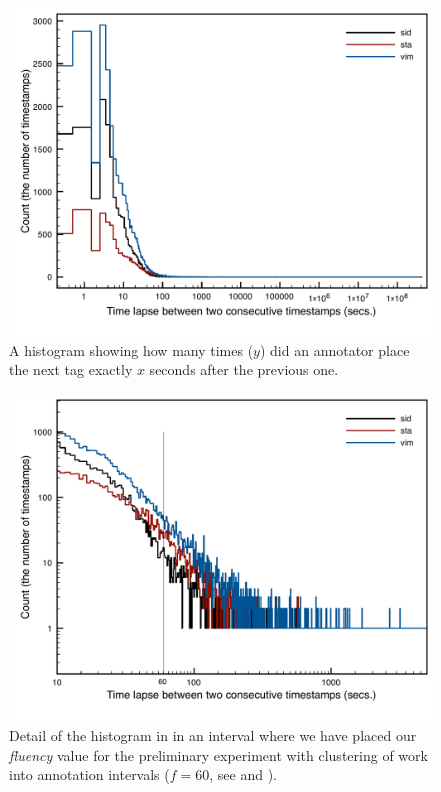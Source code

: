 \begin{figure}[htbp]
   \centering
   \includegraphics[width=.8\textwidth]{images/speed/histograms} 
   \caption{A histogram showing how many times ($y$) did an annotator place the next tag exactly $x$ seconds after the previous one.} 
   \label{fig:hist}
\end{figure}

\begin{figure}[htbp]
   \centering
   \includegraphics[width=.8\textwidth]{images/speed/histograms-detail} 
   \caption{Detail of the histogram in  in an interval where we have placed our \emph{fluency} value for the preliminary experiment with clustering of work into annotation intervals ($f=60$, see  and ).}
\label{fig:hist-detail}
\end{figure}


\todo {}\\
